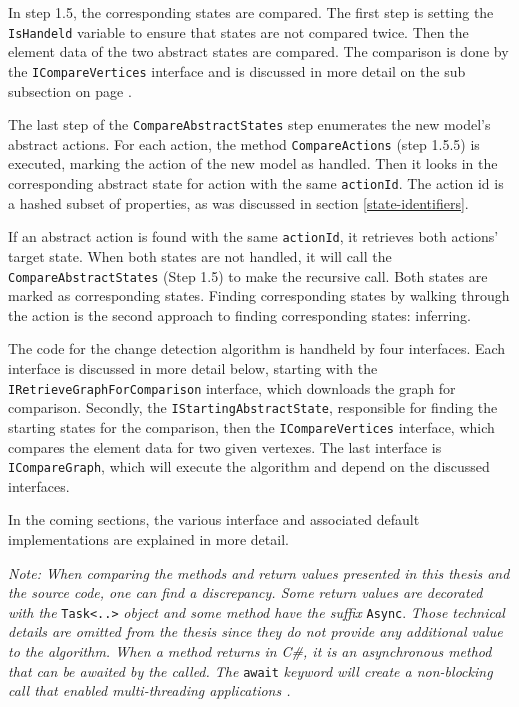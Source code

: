 In step 1.5, the corresponding states are compared. The first step is setting the \verb|IsHandeld| variable to ensure that states are not compared twice. Then the element data of the two abstract states are compared. The comparison is done by the \verb|ICompareVertices| interface and is discussed in more detail on the sub subsection on page \pageref{sec:i-compare-vertices}.

The last step of the \verb|CompareAbstractStates| step enumerates the new model's abstract actions. For each action, the method \verb|CompareActions| (step 1.5.5) is executed, marking the action of the new model as handled. Then it looks in the corresponding abstract state for action with the same \verb|actionId|. The action id is a hashed subset of properties, as was discussed in section \ref{state-identifiers}. 

If an abstract action is found with the same \verb|actionId|, it retrieves both actions' target state. When both states are not handled, it will call the \verb|CompareAbstractStates| (Step 1.5) to make the recursive call. Both states are marked as corresponding states. Finding corresponding states by walking through the action is the second approach to finding corresponding states: inferring.

The code for the change detection algorithm is handheld by four interfaces. Each interface is discussed in more detail below, starting with the \verb|IRetrieveGraphForComparison| interface, which downloads the graph for comparison. Secondly, the \verb|IStartingAbstractState|, responsible for finding the starting states for the comparison, then the \verb|ICompareVertices| interface, which compares the element data for two given vertexes. The last interface is \verb|ICompareGraph|, which will execute the algorithm and depend on the discussed interfaces. 

In the coming sections, the various interface and associated default implementations are explained in more detail.

\textit{Note: When comparing the methods and return values presented in this thesis and the source code, one can find a discrepancy. Some return values are decorated with the} \verb|Task<..>| \textit{object and some method have the suffix} \verb|Async|. \textit{Those technical details are omitted from the thesis since they do not provide any additional value to the algorithm. When a method returns in C\#, it is an asynchronous method that can be awaited by the called. The} \verb|await| \textit{keyword will create a non-blocking call that enabled multi-threading applications \cite{asynchronous-programming}.}

